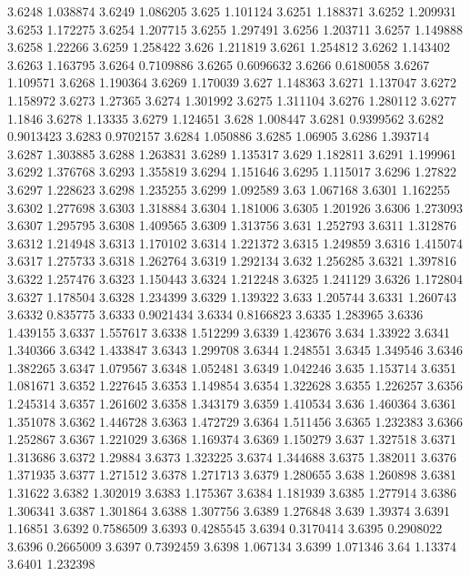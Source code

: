 3.6248  1.038874
3.6249  1.086205
3.625  1.101124
3.6251  1.188371
3.6252  1.209931
3.6253  1.172275
3.6254  1.207715
3.6255  1.297491
3.6256  1.203711
3.6257  1.149888
3.6258  1.22266
3.6259  1.258422
3.626  1.211819
3.6261  1.254812
3.6262  1.143402
3.6263  1.163795
3.6264  0.7109886
3.6265  0.6096632
3.6266  0.6180058
3.6267  1.109571
3.6268  1.190364
3.6269  1.170039
3.627  1.148363
3.6271  1.137047
3.6272  1.158972
3.6273  1.27365
3.6274  1.301992
3.6275  1.311104
3.6276  1.280112
3.6277  1.1846
3.6278  1.13335
3.6279  1.124651
3.628  1.008447
3.6281  0.9399562
3.6282  0.9013423
3.6283  0.9702157
3.6284  1.050886
3.6285  1.06905
3.6286  1.393714
3.6287  1.303885
3.6288  1.263831
3.6289  1.135317
3.629  1.182811
3.6291  1.199961
3.6292  1.376768
3.6293  1.355819
3.6294  1.151646
3.6295  1.115017
3.6296  1.27822
3.6297  1.228623
3.6298  1.235255
3.6299  1.092589
3.63  1.067168
3.6301  1.162255
3.6302  1.277698
3.6303  1.318884
3.6304  1.181006
3.6305  1.201926
3.6306  1.273093
3.6307  1.295795
3.6308  1.409565
3.6309  1.313756
3.631  1.252793
3.6311  1.312876
3.6312  1.214948
3.6313  1.170102
3.6314  1.221372
3.6315  1.249859
3.6316  1.415074
3.6317  1.275733
3.6318  1.262764
3.6319  1.292134
3.632  1.256285
3.6321  1.397816
3.6322  1.257476
3.6323  1.150443
3.6324  1.212248
3.6325  1.241129
3.6326  1.172804
3.6327  1.178504
3.6328  1.234399
3.6329  1.139322
3.633  1.205744
3.6331  1.260743
3.6332  0.835775
3.6333  0.9021434
3.6334  0.8166823
3.6335  1.283965
3.6336  1.439155
3.6337  1.557617
3.6338  1.512299
3.6339  1.423676
3.634  1.33922
3.6341  1.340366
3.6342  1.433847
3.6343  1.299708
3.6344  1.248551
3.6345  1.349546
3.6346  1.382265
3.6347  1.079567
3.6348  1.052481
3.6349  1.042246
3.635  1.153714
3.6351  1.081671
3.6352  1.227645
3.6353  1.149854
3.6354  1.322628
3.6355  1.226257
3.6356  1.245314
3.6357  1.261602
3.6358  1.343179
3.6359  1.410534
3.636  1.460364
3.6361  1.351078
3.6362  1.446728
3.6363  1.472729
3.6364  1.511456
3.6365  1.232383
3.6366  1.252867
3.6367  1.221029
3.6368  1.169374
3.6369  1.150279
3.637  1.327518
3.6371  1.313686
3.6372  1.29884
3.6373  1.323225
3.6374  1.344688
3.6375  1.382011
3.6376  1.371935
3.6377  1.271512
3.6378  1.271713
3.6379  1.280655
3.638  1.260898
3.6381  1.31622
3.6382  1.302019
3.6383  1.175367
3.6384  1.181939
3.6385  1.277914
3.6386  1.306341
3.6387  1.301864
3.6388  1.307756
3.6389  1.276848
3.639  1.39374
3.6391  1.16851
3.6392  0.7586509
3.6393  0.4285545
3.6394  0.3170414
3.6395  0.2908022
3.6396  0.2665009
3.6397  0.7392459
3.6398  1.067134
3.6399  1.071346
3.64  1.13374
3.6401  1.232398
